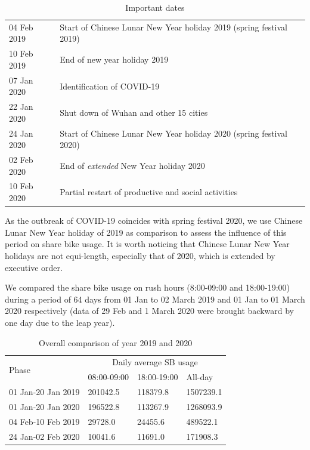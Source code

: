\documentclass[preprints,ijgi,submit,moreauthors]{Definitions/mdpi}
\begin{document}
\begin{table}[H]
    \centering
    \begin{tabular}{ll}
    04 Feb 2019 & Start of Chinese Lunar New Year holiday 2019 (spring festival 2019) \\
    10 Feb 2019 & End of new year holiday 2019\\
    07 Jan 2020 & Identification of COVID-19\\
    22 Jan 2020 & Shut down of Wuhan and other 15 cities\\
    24 Jan 2020 & Start of Chinese Lunar New Year holiday 2020 (spring festival 2020)\\
    02 Feb 2020 & End of \textit{extended} New Year holiday 2020\\
    10 Feb 2020 & Partial restart of productive and social activities
    \end{tabular}
    \caption{Important dates}
    \label{tab:my_label}
\end{table}

As the outbreak of COVID-19 coincides with spring festival 2020, we use Chinese Lunar New Year holiday of 2019 as comparison to assess the influence of this period on share bike usage.
It is worth noticing that Chinese Lunar New Year holidays are not equi-length, especially that of 2020, which is extended by executive order.

We compared the share bike usage on rush hours (8:00-09:00 and 18:00-19:00) during a period of 64 days from 01 Jan to 02 March 2019 and 01 Jan to 01 March 2020 respectively (data of 29 Feb and 1 March 2020 were brought backward by one day due to the leap year).

\begin{table}[H]
    \centering
    \begin{tabular}{|l|l|l|l|}
        \hline
        \multirow{2}{*}{Phase} &\multicolumn{3}{c|}{Daily average SB usage}\\
        \cline{2-4}
        & 08:00-09:00 & 18:00-19:00 & All-day\\
        \hline
        01 Jan-20 Jan 2019 & 201042.5 & 118379.8 & 1507239.1\\
        \hline
        01 Jan-20 Jan 2020 & 196522.8 & 113267.9 & 1268093.9\\
        \hline
        \hline
        04 Feb-10 Feb 2019 & 29728.0 & 24455.6 & 489522.1\\
        \hline
        24 Jan-02 Feb 2020 & 10041.6 & 11691.0 & 171908.3\\
        \hline
    \end{tabular}
    \caption{Overall comparison of year 2019 and 2020}\label{tab:overall_comparison}
\end{table}
\end{document}
